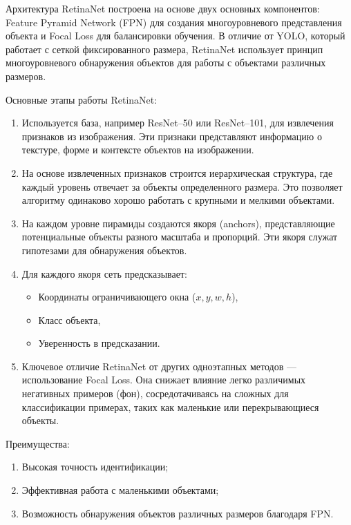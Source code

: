 Архитектура RetinaNet построена на основе двух основных компонентов: Feature Pyramid Network (FPN) для создания многоуровневого представления объекта и Focal Loss для балансировки обучения. В отличие от YOLO, который работает с сеткой фиксированного размера, RetinaNet использует принцип многоуровневого обнаружения объектов для работы с объектами различных размеров.

Основные этапы работы RetinaNet:

\begin{enumerate}
    \item
    Используется база, например ResNet--50 или ResNet--101, для извлечения признаков из изображения. Эти признаки представляют информацию о текстуре, форме и контексте объектов на изображении.
    
    \item
    На основе извлеченных признаков строится иерархическая структура, где каждый уровень отвечает за объекты определенного размера. Это позволяет алгоритму одинаково хорошо работать с крупными и мелкими объектами.
    
    \item
    На каждом уровне пирамиды создаются якоря (anchors), представляющие потенциальные объекты разного масштаба и пропорций. Эти якоря служат гипотезами для обнаружения объектов.
    
    \item
    Для каждого якоря сеть предсказывает:
    \begin{itemize}
        \item Координаты ограничивающего окна (\(x, y, w, h\)),
        \item Класс объекта,
        \item Уверенность в предсказании.
    \end{itemize}
    
    \item
    Ключевое отличие RetinaNet от других одноэтапных методов --- использование Focal Loss. Она снижает влияние легко различимых негативных примеров (фон), сосредотачиваясь на сложных для классификации примерах, таких как маленькие или перекрывающиеся объекты.
\end{enumerate}

Преимущества:
\begin{enumerate}
    \item Высокая точность идентификации;
    \item Эффективная работа с маленькими объектами;
    \item Возможность обнаружения объектов различных размеров благодаря FPN.
\end{enumerate}

